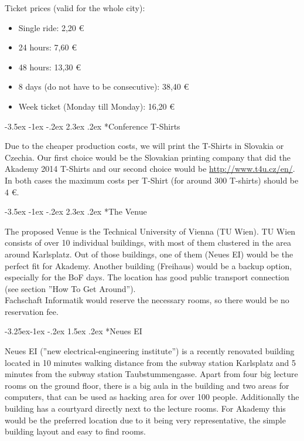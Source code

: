 \documentclass[10pt,a4paper]{article}
\makeatletter
\renewcommand\section{%
\@startsection{section}{1}{\z@}%
              {-3.5ex \@plus -1ex \@minus -.2ex}%
              {2.3ex \@plus.2ex}%
              {\color{kdelight}\sffamily\LARGE\bfseries}}
\renewcommand\subsection{%
\@startsection{subsection}{2}{\z@}%
              {-3.25ex\@plus -1ex \@minus -.2ex}%
              {1.5ex \@plus .2ex}%
              {\color{kdelight}\sffamily\Large\bfseries}}
\makeatother
\begin{document}
\vspace{10pt}
Ticket prices (valid for the whole city):
\begin{itemize}
	\item Single ride: 2,20 \euro{}
	\item 24 hours: 7,60 \euro{}
	\item 48 hours: 13,30 \euro{}
	\item 8 days (do not have to be consecutive): 38,40 \euro{}
	\item Week ticket (Monday till Monday): 16,20 \euro{}
\end{itemize}

\cleardoublepage

\section*{Conference T-Shirts}
Due to the cheaper production costs, we will print the T-Shirts in Slovakia or Czechia. Our first choice would be the Slovakian printing company that did the Akademy 2014 T-Shirts and our second choice would be \url{http://www.t4u.cz/en/}. In both cases the maximum costs per T-Shirt (for around 300 T-shirts) should be 4 \euro{}.

\cleardoublepage

\section*{The Venue}
The proposed Venue is the Technical University of Vienna (TU Wien). TU Wien consists of over 10 individual buildings, with most of them clustered in the area around Karlsplatz. Out of those buildings, one of them (Neues EI) would be the perfect fit for Akademy. Another building (Freihaus) would be a backup option, especially for the BoF days. The location has good public transport connection (see section ''How To Get Around'').\\
Fachschaft Informatik would reserve the necessary rooms, so there would be no reservation fee.

\subsection*{Neues EI}

Neues EI (''new electrical-engineering institute'') is a recently renovated building located in 10 minutes walking distance from the subway station Karlsplatz and 5 minutes from the subway station Taubstummengasse. Apart from four big lecture rooms on the ground floor, there is a big aula in the building and two areas for computers, that can be used as hacking area for over 100 people. Additionally the building has a courtyard directly next to the lecture rooms. For Akademy this would be the preferred location due to it being very representative, the simple building layout and easy to find rooms.
\end{document}
